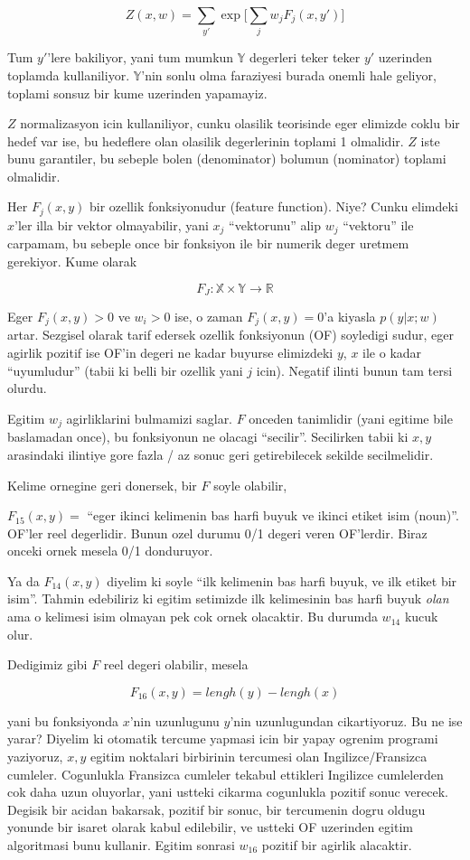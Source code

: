 \documentclass[12pt,fleqn]{article}\usepackage{../common}
\begin{document}
$$ Z(x,w) = \sum_{y'} \exp \big[ \sum_j w_j F_j(x,y') \big] $$

Tum $y'$'lere bakiliyor, yani tum mumkun $\mathbb{Y}$ degerleri teker teker
$y'$ uzerinden toplamda kullaniliyor. $\mathbb{Y}$'nin sonlu olma
faraziyesi burada onemli hale geliyor, toplami sonsuz bir kume uzerinden
yapamayiz. 

$Z$ normalizasyon icin kullaniliyor, cunku olasilik teorisinde eger
elimizde coklu bir hedef var ise, bu hedeflere olan olasilik degerlerinin
toplami 1 olmalidir. $Z$ iste bunu garantiler, bu sebeple bolen
(denominator) bolumun (nominator) toplami olmalidir. 

Her $F_j(x,y)$ bir ozellik fonksiyonudur (feature function). Niye? Cunku
elimdeki $x$'ler illa bir vektor olmayabilir, yani $x_j$ ``vektorunu'' alip
$w_j$ ``vektoru'' ile carpamam, bu sebeple once bir fonksiyon ile bir
numerik deger uretmem gerekiyor. Kume olarak

$$ F_J: \mathbb{X} \times \mathbb{Y} \to \mathbb{R} $$

Eger $ F_j(x,y) > 0 $ ve $w_i > 0$ ise, o zaman $F_j(x,y) = 0$'a kiyasla
$p(y|x;w)$ artar. Sezgisel olarak tarif edersek ozellik fonksiyonun (OF)
soyledigi sudur, eger agirlik pozitif ise OF'in degeri ne
kadar buyurse elimizdeki $y$, $x$ ile o kadar ``uyumludur'' (tabii ki belli
bir ozellik yani $j$ icin). Negatif ilinti bunun tam tersi olurdu. 

Egitim $w_j$ agirliklarini bulmamizi saglar. $F$ onceden tanimlidir (yani
egitime bile baslamadan once), bu fonksiyonun ne olacagi
``secilir''. Secilirken tabii ki $x,y$ arasindaki ilintiye gore fazla / az
sonuc geri getirebilecek sekilde secilmelidir. 

Kelime ornegine geri donersek, bir $F$ soyle olabilir, 

$ F_{15}(x,y) =$ ``eger ikinci kelimenin bas harfi buyuk ve ikinci etiket
isim (noun)''. OF'ler reel degerlidir. Bunun ozel durumu 0/1 degeri veren
OF'lerdir. Biraz onceki ornek mesela 0/1 donduruyor.

Ya da $F_{14}(x,y)$ diyelim ki soyle ``ilk kelimenin bas harfi buyuk, ve
ilk etiket bir isim''. Tahmin edebiliriz ki egitim setimizde ilk
kelimesinin bas harfi buyuk {\em olan} ama o kelimesi isim olmayan pek cok
ornek olacaktir. Bu durumda $w_{14}$ kucuk olur. 

Dedigimiz gibi $F$ reel degeri olabilir, mesela

$$ F_{16}(x,y) = lengh(y) - lengh(x) $$

yani bu fonksiyonda $x$'nin uzunlugunu $y$'nin uzunlugundan
cikartiyoruz. Bu ne ise yarar? Diyelim ki otomatik tercume yapmasi icin bir
yapay ogrenim programi yaziyoruz, $x,y$ egitim noktalari birbirinin
tercumesi olan Ingilizce/Fransizca cumleler. Cogunlukla Fransizca cumleler
tekabul ettikleri Ingilizce cumlelerden cok daha uzun oluyorlar, yani
ustteki cikarma cogunlukla pozitif sonuc verecek. Degisik bir acidan
bakarsak, pozitif bir sonuc, bir tercumenin dogru oldugu yonunde bir isaret
olarak kabul edilebilir, ve ustteki OF uzerinden egitim algoritmasi bunu
kullanir. Egitim sonrasi $w_{16}$ pozitif bir agirlik alacaktir.
\end{document}
